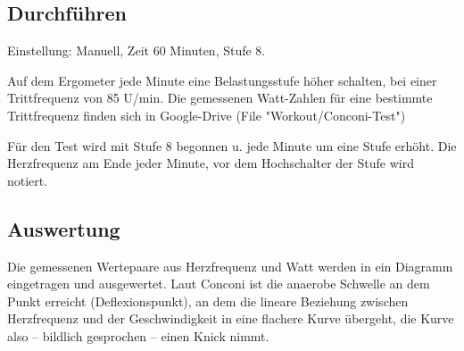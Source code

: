 \documentclass[a4paper,DIV11,BCOR1cm]{scrartcl}
\begin{document}
\subsection{Durchführen}

Einstellung: Manuell, Zeit 60 Minuten, Stufe 8.

Auf dem Ergometer jede Minute eine Belastungsstufe höher schalten, bei einer Trittfrequenz von 85 U/min.
Die gemessenen Watt-Zahlen für eine bestimmte Trittfrequenz finden sich in Google-Drive (File "Workout/Conconi-Test")

Für den Test wird mit Stufe 8 begonnen u. jede Minute um eine Stufe erhöht. Die Herzfrequenz am Ende jeder Minute, vor dem Hochschalter der Stufe wird notiert.

\subsection{Auswertung}

Die gemessenen Wertepaare aus Herzfrequenz und Watt werden in ein Diagramm eingetragen und ausgewertet.
Laut Conconi ist die anaerobe Schwelle an dem Punkt erreicht (Deflexionspunkt), an dem die lineare Beziehung zwischen Herzfrequenz und der Geschwindigkeit in eine flachere Kurve übergeht, die Kurve also – bildlich gesprochen – einen Knick nimmt.

\cite{*}



\end{document}

